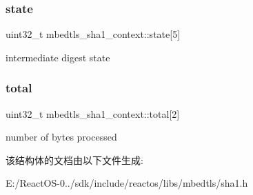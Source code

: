\subsubsection{\texorpdfstring{state}{state}}
{\footnotesize\ttfamily uint32\+\_\+t mbedtls\+\_\+sha1\+\_\+context\+::state\mbox{[}5\mbox{]}}

intermediate digest state \mbox{\label{structmbedtls__sha1__context_a19789ddfacc37f47eb34e26ae718997e}} 
\subsubsection{\texorpdfstring{total}{total}}
{\footnotesize\ttfamily uint32\+\_\+t mbedtls\+\_\+sha1\+\_\+context\+::total\mbox{[}2\mbox{]}}

number of bytes processed 

该结构体的文档由以下文件生成\+:\begin{DoxyCompactItemize}
\item 
E\+:/\+React\+O\+S-\/0../sdk/include/reactos/libs/mbedtls/sha1.\+h\end{DoxyCompactItemize}
